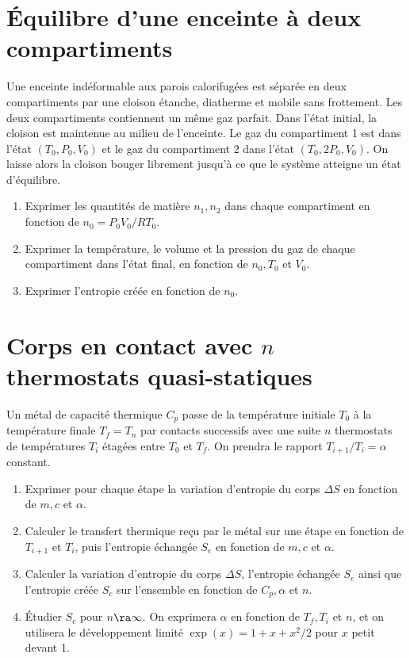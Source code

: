 \documentclass[a4paper, 10pt, final, garamond]{book}
\begin{document}
\section{Équilibre d'une enceinte à deux compartiments}
Une enceinte indéformable aux parois calorifugées est séparée en deux
compartiments par une cloison étanche, diatherme et mobile sans frottement. Les
deux compartiments contiennent un même gaz parfait. Dans l'état initial, la
cloison est maintenue au milieu de l'enceinte. Le gaz du compartiment 1 est dans
l'état $(T_0,P_0,V_0)$ et le gaz du compartiment 2 dans l'état $(T_0,2P_0,V_0)$.
On laisse alors la cloison bouger librement jusqu'à ce que le système atteigne un
état d'équilibre.
\begin{enumerate}
  \item Exprimer les quantités de matière $n_1,n_2$ dans chaque compartiment en
    fonction de $n_0 = P_0V_0/RT_0$.
  \item Exprimer la température, le volume et la pression du gaz de chaque
    compartiment dans l'état final, en fonction de $n_0,T_0$ et $V_0$.
  \item Exprimer l'entropie créée en fonction de $n_0$.
\end{enumerate}

\section{Corps en contact avec $n$ thermostats quasi-statiques}
Un métal de capacité thermique $C_p$ passe de la température initiale $T_0$ à la
température finale $T_f = T_n$ par contacts successifs avec une suite $n$
thermostats de températures $T_i$ étagées entre $T_0$ et $T_f$. On prendra le
rapport $T_{i+1}/T_i = \alpha$ constant.
\begin{enumerate}
  \item Exprimer pour chaque étape la variation d'entropie du corps $\Delta S$
    en fonction de $m, c$ et $\alpha$.
  \item Calculer le transfert thermique reçu par le métal sur une étape en
    fonction de $T_{i+1}$ et $T_i$, puis l'entropie échangée $S_e$ en fonction
    de $m, c$ et $\alpha$.
  \item Calculer la variation d'entropie du corps $\Delta S$, l'entropie
    échangée $S_e$ ainsi que l'entropie créée $S_c$ sur l'ensemble en fonction
    de $C_p, \alpha$ et $n$.
  \item Étudier $S_c$ pour $n \ra \infty$. On exprimera $\alpha$ en fonction de
    $T_f, T_i$ et $n$, et on utilisera le développement limité $\exp(x) =
    1+x+x^2/2$ pour $x$ petit devant 1.
\end{enumerate}
\end{document}
